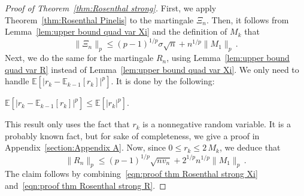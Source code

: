 \documentclass[AHL,Unicode,longabstracts,published]{cedram}
\newcommand{\bE}{\mathbb{E}}
\begin{document}
\begin{proof}[Proof of Theorem~\ref{thm:Rosenthal strong}]
First, we apply Theorem~\ref{thm:Rosenthal Pinelis} to the martingale $\Xi_n$. Then, it follows from Lemma~\ref{lem:upper bound quad var Xi} and the definition of $M_k$ that
\begin{equation}\label{eqn:proof thm Rosenthal strong Xi}
\|\Xi_n\|_p\leq (p-1)^{1/p}\sigma\sqrt n +n^{1/p} \|M_1\|_p\,.
\end{equation}
Next, we do the same for the martingale $R_n$, using Lemma~\ref{lem:upper bound quad var R} instead of Lemma~\ref{lem:upper bound quad var Xi}. We only need to handle $\bE[|r_k-\bE_{k-1}[r_k]|^p]$. It is done by the following:
\begin{lemm}\label{lem:moment nonnegative rv recentered}
$\bE[|r_k-\bE_{k-1}[r_k]|^p]\leq \bE[|r_k|^p]$.
\end{lemm}

This result only uses the fact that $r_k$ is a nonnegative random variable. It is a probably known fact, but for sake of completeness, we give a proof in Appendix~\ref{section:Appendix A}. Now, since $0\leq r_k\leq 2\,M_k$, we deduce that
\begin{equation}\label{eqn:proof thm Rosenthal strong R}
\|R_n\|_p\leq (p-1)^{1/p}\sqrt{nv_n}+2^{1/p}n^{1/p} \|M_1\|_p\,.
\end{equation}
The claim follows by combining~\eqref{eqn:proof thm Rosenthal strong Xi} and~\eqref{eqn:proof thm Rosenthal strong R}.
\end{proof}
\end{document}
